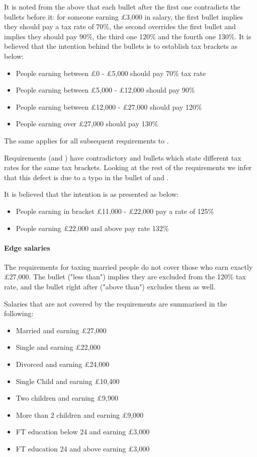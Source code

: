 It is noted from the above that each bullet after the first one contradicts the bullets before it: for someone earning £3,000 in salary, the first bullet implies they should pay a tax rate of 70\%, the second overrides the first bullet and implies they should pay 90\%, the third one 120\% and the fourth one 130\%. It is believed that the intention behind the bullets is to establish tax brackets as below: 
\begin{itemize}
	\item People earning between £0 - £5,000 should pay 70\% tax rate 
	\item People earning between £5,000 - £12,000 should pay 90\%
	\item People earning between £12,000 - £27,000 should pay 120\%
	\item People earning over £27,000 should pay 130\%
\end{itemize}
The same applies for all subsequent requirements \REightSix \space to \REightTwelve. 

Requirements (\REightSix \space and \REightSeven) have contradictory  and  bullets which state different tax rates for the same tax brackets. Looking at the rest of the requirements we infer that this defect is due to a typo in the  bullet of \REightSix \space and \REightSeven. 

It is believed that the intention is as presented as below: 
\begin{itemize}
	\item People earning in bracket £11,000 - £22,000 pay a rate of 125\%
	\item People earning £22,000 and above pay rate 132\%
\end{itemize}

\paragraph{Edge salaries}
The requirements for taxing married people do not cover those who earn exactly £27,000. The  bullet ("less than") implies they are excluded from the 120\% tax rate, and the bullet right after ("above than") excludes them as well. 
\par
Salaries that are not covered by the requirements are summarised in the following:
\begin{itemize}
	\item Married and earning £27,000
	\item Single and earning £22,000
	\item Divorced and earning £24,000
	\item Single Child and earning £10,400
	\item Two children and earning £9,900
	\item More than 2 children and earning £9,000
	\item FT education below 24 and earning £3,000
	\item FT education 24 and above earning £3,000
\end{itemize}

